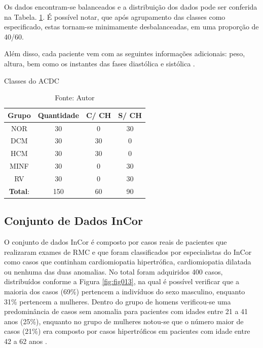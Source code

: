 Os dados encontram-se balanceados e a distribuição dos dados pode ser conferida na Tabela. \ref{tab:count_dataset}. É possível notar, que após agrupamento das classes como especificado, estas tornam-se minimamente desbalanceadas, em uma proporção de 40/60.

Além disso, cada paciente vem com as seguintes informações adicionais: peso, altura, bem como os instantes das fases diastólica e sistólica \cite{bernardDeepLearningTechniques2018a}.

\begin{table}[hbtp]
    \centering
    \caption{Classes do ACDC}
    \renewcommand{\arraystretch}{1} %
    \begin{tabular}{|c|c|c|c|}
    \hline 
          \textbf{Grupo} & \textbf{Quantidade} & \textbf{C/ CH} & \textbf{S/ CH}  \\ 
    \hline 
        NOR & 30 & 0 & 30 \\ 
        DCM & 30 & 30 & 0\\ 
        HCM & 30 & 30 & 0\\ 
        MINF & 30 & 0 & 30 \\ 
        RV & 30 & 0 & 30 \\
    \hline 
        \textbf{Total}: & 150  & 60 & 90\\ 
    \hline 
    \end{tabular} 
    \caption*{Fonte: Autor}
    \label{tab:count_dataset}
\end{table}

\subsection{Conjunto de Dados InCor} 
\label{subsec:cap4_incor}

O conjunto de dados \gls{InCor} é composto por casos reais de pacientes que realizaram exames de \gls{RMC} e que foram classificados por especialistas do \gls{InCor} como casos que continham cardiomiopatia hipertrófica, cardiomiopatia dilatada ou nenhuma das duas anomalias. No total foram adquiridos 400 casos, distribuídos conforme a Figura \ref{fig:fig013}, na qual é possível verificar que a maioria dos casos (69\%) pertencem a indivíduos do sexo masculino, enquanto 31\% pertencem a mulheres. Dentro do grupo de homens verificou-se uma predominância de casos sem anomalia para pacientes com idades entre 21 a 41 anos (25\%), enquanto no grupo de mulheres notou-se que o número maior de casos (21\%) era composto por casos hipertróficos em pacientes com idade entre 42 a 62 anos \cite{bergamascoRECUPERACAOOBJETOSMEDICOS2018}.

